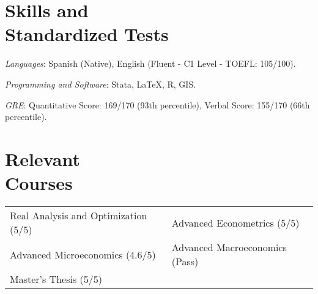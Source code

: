 \documentclass[margin,line]{res}
\begin{document}
\begin{resume}



\vspace{-.2cm}

\section{\sc Skills  and \\ Standardized Tests}

\textit{Languages}: Spanish (Native), English (Fluent - C1 Level - TOEFL: 105/100).

\vspace{-.2cm}

\textit{Programming and Software}: Stata, {\LaTeX}, \textsc{R}, \textsc{GIS}. 

\vspace{-.2cm}

\textit{GRE}: Quantitative Score: 169/170 (93th percentile), Verbal Score: 155/170 (66th percentile).


\section{\sc Relevant \\ Courses}

\begin{tabular}{p{7cm}p{7cm}}
 Real Analysis and Optimization (5/5) &Advanced Econometrics  (5/5)                      \\ 
 Advanced Microeconomics (4.6/5)  & Advanced Macroeconomics (Pass) \\
 Master's Thesis (5/5)   &      \\ 
\end{tabular}


\end{resume}
\end{document}
